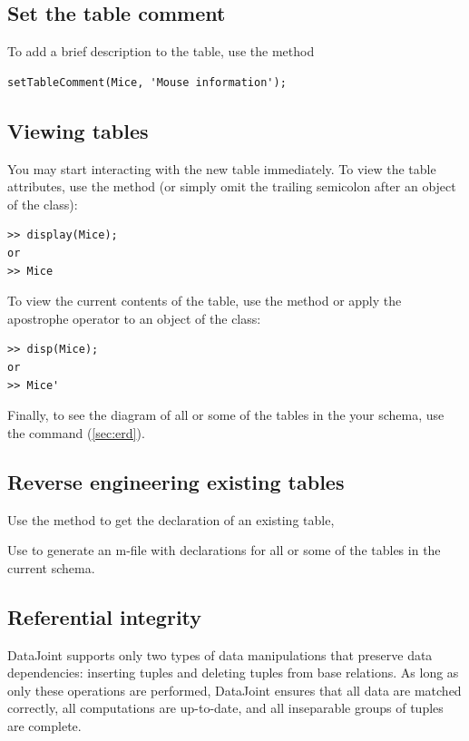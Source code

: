 \documentclass[10pt]{article}
\begin{document}
\subsection{Set the table comment}
To add a brief description to the table, use the  method
\begin{lstlisting}
setTableComment(Mice, 'Mouse information');
\end{lstlisting}

\subsection{Viewing tables}
You may start interacting with the new table immediately. To view the table attributes, use the  method (or simply omit the trailing semicolon after an object of the class):
\begin{lstlisting}
>> display(Mice);
or
>> Mice
\end{lstlisting}

To view the current contents of the table, use the  method or apply the apostrophe operator to an object of the class:
\begin{lstlisting}
>> disp(Mice);
or
>> Mice'
\end{lstlisting}

Finally, to see the diagram of all or some of the tables in the your schema, use the  command (\autoref{sec:erd}).

\subsection{Reverse engineering existing tables}
Use the  method to get the  declaration of an existing table, 

Use  to generate an m-file with declarations for all or some of the tables in the current schema.


\subsection{Referential integrity}
DataJoint supports only two types of data manipulations that preserve data dependencies: inserting tuples and deleting tuples from base relations. As long as only these operations are performed, DataJoint ensures that all data are matched correctly, all computations are up-to-date, and all inseparable groups of tuples are complete.
\end{document}
